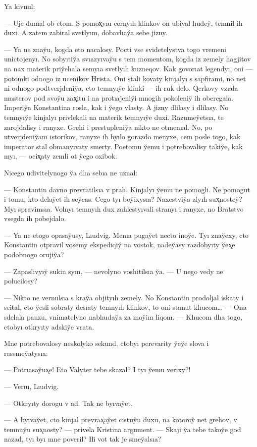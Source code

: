 \documentclass[10pt]{book}
\begin{document}
Ya kivnul:

— Uje dumal ob etom. S pomox̨yıu cernyıh klinkov on ubival lıudey̆, temnil ih duxi. A zatem zabiral svetlyım, dobavlıay̆a sebe jizny.

— Ya ne znay̆u, kogda eto nacalosy. Pocti vse svidetelystva togo vremeni unictojenyı. No sobyıtiy̆a svıazyıvay̆u s tem momentom, kogda iz zemely hagjitov na nax materik priy̆ehala semyıa svetlyıh kuzneqov. Kak govorıat legendyı, oni — potomki odnogo iz ucenikov Hrista. Oni stali kovaty kinjalyı s sapfirami, no net ni odnogo podtverjdeniy̆a, cto temnyıy̆e klinki — ih ruk delo. Qerkovy vzıala masterov pod svoy̆u zax̨itu i na protıajeniy̆i mnogih pokoleniy̆ ih oberegala. Imperiy̆a Konstantina rosla, kak i y̆ego vlasty. A jizny dlilasy i dlilasy. No temnyıy̆e kinjalyı privlekali na materik temnyıy̆e duxi. Razumey̆etsıa, te zarojdalisy i ranyxe. Grehi i prestupleniy̆a nikto ne otmenıal. No, po utverjdeniy̆am istorikov, ranyxe ih byılo gorazdo menyxe, cem posle togo, kak imperator stal obmanyıvaty smerty. Poetomu y̆emu i potrebovalisy takiy̆e, kak myı, — ocix̨aty zemli ot y̆ego oxibok.

Nicego udivitelynogo y̆a dlıa sebıa ne uznal:

— Konstantin davno prevratilsıa v prah. Kinjalyı y̆emu ne pomogli. Ne pomogut i tomu, kto delay̆et ih sey̆cas. Cego tyı boy̆ixysıa? Naxestviy̆a zlyıh sux̨nostey̆? Myı spravimsıa. Volnyı temnyıh dux zahlestyıvali stranyı i ranyxe, no Bratstvo vsegda ih pobejdalo.

— Ya ne etogo opasay̆usy, Lıudvig. Menıa pugay̆et necto inoy̆e. Tyı znay̆exy, cto Konstantin otpravil vosemy ekspediqiy̆ na vostok, nadey̆asy razdobyıty y̆ex̨e podobnogo orujiy̆a?

— Zapaslivyıy̆ sukin syın, — nevolyno voshitilsıa y̆a. — U nego vedy ne polucilosy?

— Nikto ne vernulsıa s kray̆a objityıh zemely. No Konstantin prodoljal iskaty i scital, cto y̆esli sobraty desıaty temnyıh klinkov, to oni stanut klıucom… — Ona sdelala pauzu, vnimatelyno nablıuday̆a za moy̆im liqom. — Klıucom dlıa togo, ctobyı otkryıty adskiy̆e vrata.

Mne potrebovalosy neskolyko sekund, ctobyı perevarity y̆ey̆e slova i rassmey̆atysıa:

— Potrıasay̆ux̨e! Eto Valyter tebe skazal? I tyı y̆emu verixy?!

— Verıu, Lıudvig.

— Otkryıty dorogu v ad. Tak ne byıvay̆et.

— A byıvay̆et, cto kinjal prevrax̨ay̆et cistuy̆u duxu, na kotoroy̆ net grehov, v temnuy̆u sux̨nosty? — privela Kristina argument. — Skaji y̆a tebe takoy̆e god nazad, tyı byı mne poveril? Ili vot tak je smey̆alsıa?
\end{document}

